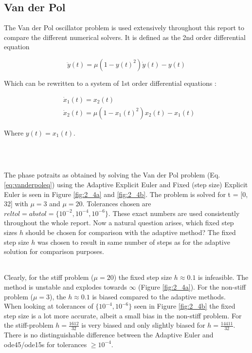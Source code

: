 \subsection{Van der Pol}
The Van der Pol oscillator problem is used extensively throughout this report to compare the different numerical solvers. It is defined as the 2nd order differential equation

\begin{equation}
\ddot{y}(t)=\mu\left(1-y(t)^{2}\right) \dot{y}(t)-y(t)
\end{equation}

Which can be rewritten to a system of 1st order differential equations \cite{JrgensenScientificEquationse}: 

\begin{equation}
\label{eq:vanderpoleq}
\begin{aligned}
&\dot{x}_{1}(t)=x_{2}(t) \\
&\dot{x}_{2}(t)=\mu\left(1-x_{1}(t)^{2}\right) x_{2}(t)-x_{1}(t)
\end{aligned}
\end{equation}

Where $y(t) = x_{1}(t)$.


\\\

The phase potraits as obtained by solving the Van der Pol problem (Eq. \ref{eq:vanderpoleq}) using the Adaptive Explicit Euler and Fixed (step size) Explicit Euler is seen in Figure \ref{fig:2_4a} and \ref{fig:2_4b}. The problem is solved for t = [0, 32] with $\mu = 3$ and $\mu =20$. Tolerances chosen are $reltol = abstol = \{10^{-2}, 10^{-4}, 10^{-6}\}$. These exact numbers are used consistently throughout the whole report.
Now a natural question arises, which fixed step sizes $h$ should be chosen for comparison with the adaptive method? The fixed step size $h$ was chosen to result in same number of steps as for the adaptive solution for comparison purposes.

\\
Clearly, for the stiff problem ($\mu = 20$) the fixed step size $h \approx 0.1$ is infeasible. The method is unstable and explodes towards $\infty$ (Figure \ref{fig:2_4a}). For the non-stiff problem ($\mu = 3$), the $h \approx 0.1$ is biased compared to the adaptive methods.
\\

When looking at tolerances of $\{10^{-4}, 10^{-6}\}$ seen in Figure \ref{fig:2_4b} the fixed step size is a lot more accurate, albeit a small bias in the non-stiff problem. For the stiff-problem $h=\frac{1612}{32}$ is very biased and only slightly biased for $h=\frac{14411}{32}$. There is no distinguishable difference between the Adaptive Euler and ode45/ode15s for tolerances $\geq 10^{-4}$.
\\

